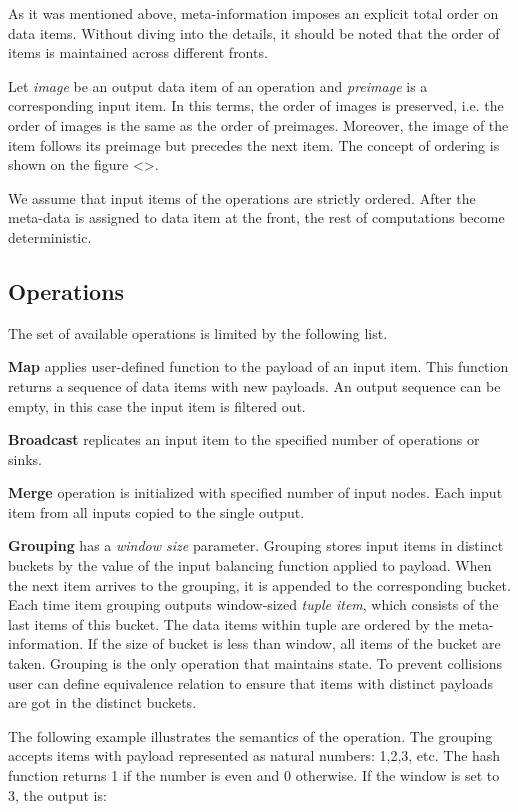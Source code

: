 As it was mentioned above, meta-information imposes an explicit total order on data items. Without diving into the details, it should be noted that the order of items is maintained across different fronts.

Let {\it image} be an output data item of an operation and {\it preimage} is a corresponding input item. In this terms, the order of images is preserved, i.e. the order of images is the same as the order of preimages. Moreover, the image of the item follows its preimage but precedes the next item. The concept of ordering is shown on the figure <>.

We assume that input items of the operations are strictly ordered. After the meta-data is assigned to data item at the front, the rest of computations become deterministic.

\subsection{Operations}

The set of available operations is limited by the following list.

{\bf Map} applies user-defined function to the payload of an input item. This function returns a sequence of data items with new payloads. An output sequence can be empty, in this case the input item is filtered out.

{\bf Broadcast} replicates an input item to the specified number of operations or sinks. 

{\bf Merge} operation is initialized with specified number of input nodes. Each input item from all inputs copied to the single output.

{\bf Grouping} has a {\it window size} parameter. Grouping stores input items in distinct buckets by the value of the input balancing function applied to payload. When the next item arrives to the grouping, it is appended to the corresponding bucket. Each time item grouping outputs window-sized {\it tuple item}, which consists of the last items of this bucket. The data items within tuple are ordered by the meta-information. If the size of bucket is less than window, all items of the bucket are taken. Grouping is the only operation that maintains state. To prevent collisions user can define equivalence relation to ensure that items with distinct payloads are got in the distinct buckets.

The following example illustrates the semantics of the operation. The grouping accepts items with payload represented as natural numbers: 1,2,3, etc. The hash function returns 1 if the number is even and 0 otherwise. If the window is set to 3, the output is:

